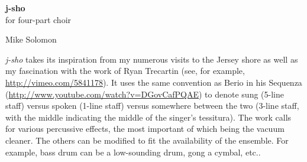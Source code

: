 \documentclass[a4paper]{book}
\begin{document}
\begin{titlepage}
\begin{flushright}
{\Huge \bfseries j-sho \\ }
{\large for four-part choir \\}
\par
{}
{\Large Mike Solomon}
\end{flushright}
\end{titlepage}
\thispagestyle{empty} 
\frontmatter
\clearpage
\emph{j-sho} takes its inspiration from my numerous visits to the Jersey
shore as well as my fascination with the work of Ryan Trecartin (see, for
example, \url{http://vimeo.com/5841178}).  It uses
the same convention as Berio in his Sequenza
(\url{http://www.youtube.com/watch?v=DGovCafPQAE})
to denote sung (5-line staff) versus spoken (1-line staff) versus somewhere
between the two (3-line staff, with the middle indicating the middle of the
singer's tessitura).  The work calls for various percussive
effects, the most important of which being the vacuum cleaner.  The others
can be modified to fit the availability of the ensemble.  For example, bass
drum can be a low-sounding drum, gong a cymbal, etc..
\end{document}
